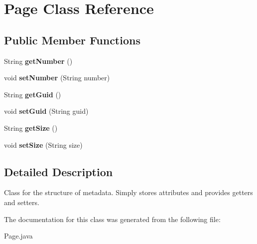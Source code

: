 \hypertarget{class_page}{}\section{Page Class Reference}
\label{class_page}
\subsection*{Public Member Functions}
\begin{DoxyCompactItemize}
\item 
\mbox{\label{class_page_abd4bfacb4497ba69d9a8b0596b1cb6fd}} 
String {\bfseries get\+Number} ()
\item 
\mbox{\label{class_page_ad5fc1c44d8203ad37795801d7f4b83d8}} 
void {\bfseries set\+Number} (String number)
\item 
\mbox{\label{class_page_af852d505a70157806e0dedd9c4dcbce3}} 
String {\bfseries get\+Guid} ()
\item 
\mbox{\label{class_page_a623a629ca25d81ea9e6497b1dbe26c31}} 
void {\bfseries set\+Guid} (String guid)
\item 
\mbox{\label{class_page_a96792e368c2dc2cc41b41d96c5d987c4}} 
String {\bfseries get\+Size} ()
\item 
\mbox{\label{class_page_a6da54ab7d1caf3cf94c0b5dc0eb5a96d}} 
void {\bfseries set\+Size} (String size)
\end{DoxyCompactItemize}


\subsection{Detailed Description}
Class for the structure of metadata. Simply stores attributes and provides getters and setters. 

The documentation for this class was generated from the following file\+:\begin{DoxyCompactItemize}
\item 
Page.\+java\end{DoxyCompactItemize}
